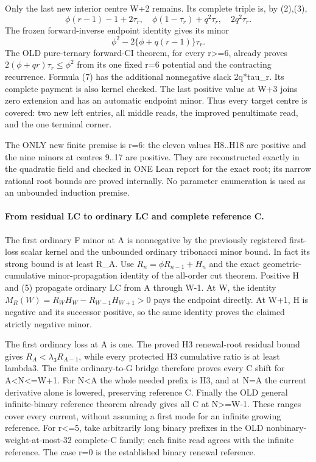 Only the last new interior centre W+2 remains. Its complete triple
is, by (2),(3),
\[
 \phi(r-1)-1+2\tau_r,\quad
 \phi(1-\tau_r)+q^2\tau_r,\quad 2q^2\tau_r.
\]
The frozen forward-inverse endpoint identity gives its minor
\[
                 \phi^2-2\{\phi+q(r-1)\}\tau_r.      \tag{7}
\]
The OLD pure-ternary forward-CI theorem, for every r>=6, already
proves $2(\phi+qr)\tau_r\le\phi^2$ from its one fixed r=6
potential and the contracting recurrence. Formula (7) has the
additional nonnegative slack 2q*tau_r. Its complete payment is
also kernel checked. The last positive value at W+3 joins zero
extension and has an automatic endpoint minor. Thus every target
centre is covered: two new left entries, all middle reads, the
improved penultimate read, and the one terminal corner.

The ONLY new finite premise is r=6: the eleven values H8..H18
are positive and the nine minors at centres 9..17 are positive.
They are reconstructed exactly in the quadratic field and checked
in ONE Lean report for the exact root; its narrow rational root
bounds are proved internally. No parameter enumeration is used
as an unbounded induction premise.

\paragraph{From residual LC to ordinary LC and complete reference C.}
The first ordinary F minor at A is nonnegative by the previously
registered first-loss scalar kernel and the unbounded ordinary
tribonacci minor bound. In fact its strong bound is at least R_A.
Use $R_n=\phi R_{n-1}+H_n$ and the exact geometric-cumulative
minor-propagation identity of the all-order cut theorem. Positive H
and (5) propagate ordinary LC from A through W-1. At W, the
identity
$M_R(W)=R_WH_W-R_{W-1}H_{W+1}>0$ pays the endpoint directly.
At W+1, H is negative and its successor positive, so the same
identity proves the claimed strictly negative minor.

The first ordinary loss at A is one. The proved H3 renewal-root
residual bound gives $R_A<\lambda_3R_{A-1}$, while every protected
H3 cumulative ratio is at least lambda3. The finite ordinary-to-G
bridge therefore proves every C shift for A<N<=W+1. For N<A
the whole needed prefix is H3, and at N=A the current derivative
alone is lowered, preserving reference C. Finally the OLD general
infinite-binary reference theorem already gives all C at N>=W-1.
These ranges cover every current, without assuming a first mode
for an infinite growing reference. For r<=5, take arbitrarily long
binary prefixes in the OLD nonbinary-weight-at-most-32 complete-C
family; each finite read agrees with the infinite reference. The
case r=0 is the established binary renewal reference.

